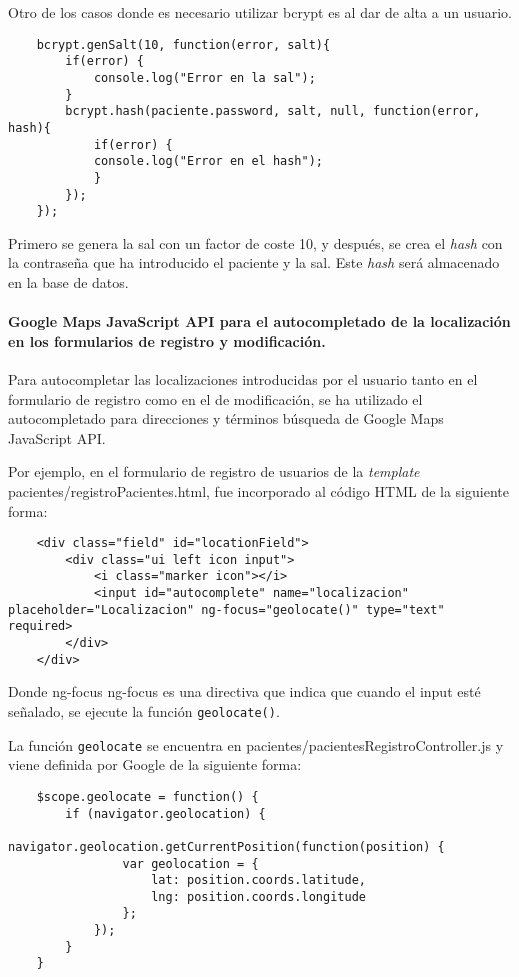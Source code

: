 Otro de los casos donde es necesario utilizar bcrypt es al dar de alta a un usuario.


\medskip
\begin{lstlisting}
	bcrypt.genSalt(10, function(error, salt){
		if(error) {
			console.log("Error en la sal");
		}
		bcrypt.hash(paciente.password, salt, null, function(error, hash){
			if(error) {
			console.log("Error en el hash");
			} 
		});
	});
\end{lstlisting}


Primero se genera la sal con un factor de coste 10, y después, se crea el \textit{hash} con la contraseña que ha introducido el paciente y la sal. Este \textit{hash} será almacenado en la base de datos.


\paragraph*{Google Maps JavaScript API para el autocompletado de la localización en los formularios de registro y modificación.}
Para autocompletar las localizaciones introducidas por el usuario tanto en el formulario de registro como en el de modificación, se ha utilizado el autocompletado para direcciones y términos búsqueda de Google Maps JavaScript API. 


Por ejemplo, en el formulario de registro de usuarios de la \textit{template} pacientes/registroPacientes.html, fue incorporado al código HTML de la siguiente forma:


\medskip
\begin{lstlisting}
	<div class="field" id="locationField">
		<div class="ui left icon input">
			<i class="marker icon"></i>
			<input id="autocomplete" name="localizacion" placeholder="Localizacion" ng-focus="geolocate()" type="text" required>
		</div>
	</div>
\end{lstlisting}


Donde ng-focus ng-focus es una directiva que indica que cuando el input esté señalado, se ejecute la función \texttt{geolocate()}.


La función \texttt{geolocate} se encuentra en pacientes/pacientesRegistroController.js y viene definida por Google de la siguiente forma:


\medskip
\begin{lstlisting}
	$scope.geolocate = function() {
		if (navigator.geolocation) {
			navigator.geolocation.getCurrentPosition(function(position) {
				var geolocation = {
					lat: position.coords.latitude,
					lng: position.coords.longitude
				};
			});
		}
	}
\end{lstlisting}


